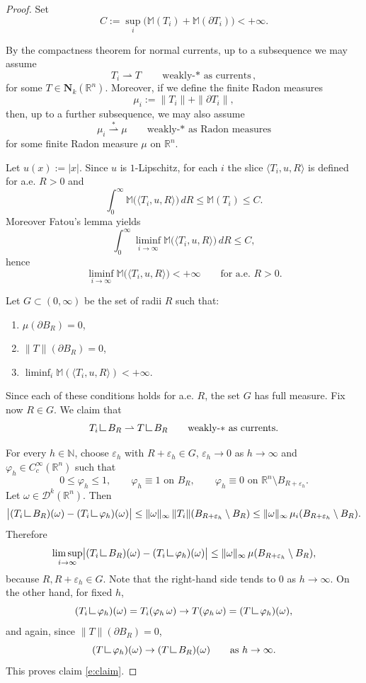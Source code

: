\documentclass{article}
\numberwithin{equation}{section}
\theoremstyle{plain}%
\theoremstyle{definition}
\theoremstyle{definition}
\newcommand{\mrestr}{\mathop{\hbox{\vrule height 7pt width 0.5pt depth 0pt
\vrule height 0.5pt width 6pt depth 0pt}}\nolimits}
\begin{document}
\begin{proof}
Set
$$
C:=\sup_i\bigl(\mathbb M(T_i)+\mathbb M(\partial T_i)\bigr)<+\infty.
$$

By the compactness theorem for normal currents, up to a subsequence we may assume
$$
T_i \rightharpoonup T
\qquad \text{weakly-$*$ as currents},
$$
for some $T\in \mathbf N_k(\mathbb R^n)$.
Moreover, if we define the finite Radon measures
$$
\mu_i:=\|T_i\|+\|\partial T_i\|,
$$
then, up to a further subsequence, we may also assume
$$
\mu_i \stackrel{*}{\rightharpoonup} \mu
\qquad \text{weakly-* as Radon measures}
$$
for some finite Radon measure $\mu$ on $\mathbb R^n$.

Let
$u(x):=|x|$. Since $u$ is $1$-Lipschitz, for each $i$ the slice
$\langle T_i,u,R\rangle$ is defined for a.e. $R>0$ and
$$
\int_0^\infty \mathbb M\bigl(\langle T_i,u,R\rangle\bigr)\,dR
\le\mathbb M(T_i)
\le C.
$$
Moreover Fatou's lemma yields
$$
\int_0^\infty \liminf_{i\to\infty}\mathbb M\bigl(\langle T_i,u,R\rangle\bigr)\,dR
\le C,
$$
hence
$$
\liminf_{i\to\infty}\mathbb M\bigl(\langle T_i,u,R\rangle\bigr)<+\infty
\qquad \text{for a.e. } R>0.
$$

Let $G\subset (0,\infty)$ be the set of radii $R$ such that:
\begin{enumerate}
\item $\mu(\partial B_R)=0$,
\item $\|T\|(\partial B_R)=0$,
\item $\liminf_i\mathbb M(\langle T_i,u,R\rangle)<+\infty$.
\end{enumerate}
Since each of these conditions holds for a.e. $R$, the set $G$ has full measure. Fix now $R\in G$. We claim that
\begin{equation}\label{e:claim}
T_i\mrestr B_R \rightharpoonup T\mrestr B_R
\qquad \text{weakly-$*$ as currents}.
\end{equation}

For every $h\in\mathbb{N}$, choose $\varepsilon_h$ with $R+\varepsilon_h\in G$, $\varepsilon_h\to 0$ as $h\to\infty$ and
$\varphi_h\in C_c^\infty(\mathbb R^n)$ such that
$$
0\le \varphi_h\le 1,\qquad
\varphi_h\equiv 1 \text{ on } B_R,\qquad
\varphi_h\equiv 0 \text{ on } \mathbb R^n\setminus B_{R+\varepsilon_h}.
$$
Let $\omega\in \mathcal D^k(\mathbb R^n)$. Then
$$
\bigl|(T_i\mrestr B_R)(\omega)-(T_i\mrestr \varphi_h)(\omega)\bigr|
\le \|\omega\|_\infty\,\|T_i\|(B_{R+\varepsilon_h}\setminus B_R)
\le \|\omega\|_\infty\,\mu_i(B_{R+\varepsilon_h}\setminus B_R).
$$
Therefore
$$
\limsup_{i\to\infty}
\bigl|(T_i\mrestr B_R)(\omega)-(T_i\mrestr \varphi_h)(\omega)\bigr|
\le \|\omega\|_\infty\,\mu(B_{R+\varepsilon_h}\setminus B_R),
$$
because $R, R+\varepsilon_h\in G$. Note that the right-hand side tends to $0$ as $h\to\infty$. On the other hand, for fixed $h$,
$$
(T_i\mrestr \varphi_h)(\omega)=T_i(\varphi_h\,\omega)\to T(\varphi_h\,\omega)=(T\mrestr \varphi_h)(\omega),
$$
and again, since $\|T\|(\partial B_R)=0$,
$$
(T\mrestr \varphi_h)(\omega)\to (T\mrestr B_R)(\omega)
\qquad \text{as } h\to\infty.
$$
This proves claim \eqref{e:claim}.


\end{proof}
\end{document}
